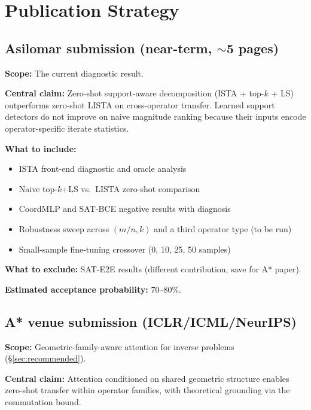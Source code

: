 \documentclass[11pt]{article}
\begin{document}
\section{Publication Strategy}
\label{sec:publication}

\subsection{Asilomar submission (near-term, $\sim$5 pages)}

\textbf{Scope:} The current diagnostic result.

\textbf{Central claim:} Zero-shot support-aware decomposition
(ISTA + top-$k$ + LS) outperforms zero-shot LISTA on
cross-operator transfer. Learned support detectors do not
improve on naive magnitude ranking because their inputs
encode operator-specific iterate statistics.

\textbf{What to include:}
\begin{itemize}[leftmargin=2em]
    \item ISTA front-end diagnostic and oracle analysis
    \item Naive top-$k$+LS vs.\ LISTA zero-shot comparison
    \item CoordMLP and SAT-BCE negative results with diagnosis
    \item Robustness sweep across $(m/n, k)$ and a third operator
    type (to be run)
    \item Small-sample fine-tuning crossover (0, 10, 25, 50 samples)
\end{itemize}

\textbf{What to exclude:}
SAT-E2E results (different contribution, save for A* paper).

\textbf{Estimated acceptance probability:} 70--80\%.

\subsection{A* venue submission (ICLR/ICML/NeurIPS)}

\textbf{Scope:} Geometric-family-aware attention for inverse
problems (\S\ref{sec:recommended}).

\textbf{Central claim:} Attention conditioned on shared geometric
structure enables zero-shot transfer within operator families,
with theoretical grounding via the commutation bound.
\end{document}

